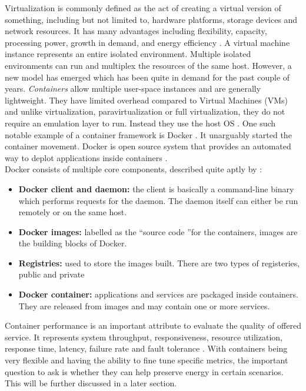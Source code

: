 Virtualization is commonly defined as the act of creating a virtual version of something, 
including but not limited to, hardware platforms, storage devices and network resources. It has many advantages 
including flexibility, capacity, processing power, growth in demand, and energy efficiency \cite{8360360}. A virtual 
machine instance represents an entire isolated environment. Multiple isolated environments can run and multiplex the 
resources of the same host. However, a new model has emerged which has been quite in demand for the past couple of years. 
\textit{Containers} \cite{turnbull_2014} allow multiple user-space instances and are generally lightweight. They have 
limited overhead compared to Virtual Machines (VMs) and unlike virtualization, paravirtualization or full virtualization, 
they do not require an emulation layer to run. Instead they use the host OS \cite{6903537}. One such notable example 
of a container framework is Docker \cite{turnbull_2014}. It unarguably started the container movement. Docker is open source 
system that provides an automated way to deplot applications inside containers \cite{8360360}. \\
Docker consists of multiple core components, described quite aptly by \cite{turnbull_2014}: 
\begin{itemize}
    \item \textbf{Docker client and daemon: }the client is basically a command-line binary which performs requests for the daemon. The daemon itself can either be run remotely or on the same host.
    \item \textbf{Docker images: }labelled as the \textquotedblleft source code \textquotedblright for the containers, images are the building blocks of Docker.
    \item \textbf{Registries: }used to store the images built. There are two types of registeries, public and private
    \item \textbf{Docker container: }applications and services are packaged inside containers. They are released from images and may contain one or more services.
\end{itemize}

Container performance is an important attribute to evaluate the quality of offered service. It represents 
system throughput, responsiveness, resource utilization, response time, latency, failure rate and fault 
tolerance \cite{perfcont}. With containers being very flexible and having the ability to fine tune specific metrics, 
the important question to ask is whether they can help preserve energy in certain scenarios. This will be further discussed 
in a later section. \\

